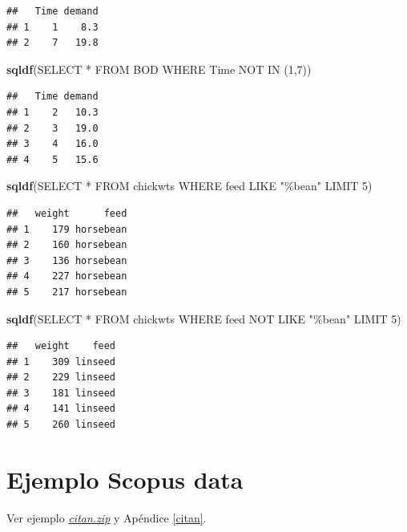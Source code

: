 \documentclass[
]{book}
\newenvironment{Shaded}{\begin{snugshade}}{\end{snugshade}}
\newcommand{\FunctionTok}[1]{\textcolor[rgb]{0.13,0.29,0.53}{\textbf{#1}}}
\newcommand{\NormalTok}[1]{#1}
\newcommand{\StringTok}[1]{\textcolor[rgb]{0.31,0.60,0.02}{#1}}
\begin{document}
\begin{verbatim}
##   Time demand
## 1    1    8.3
## 2    7   19.8
\end{verbatim}

\begin{Shaded}
\begin{Highlighting}[]
\FunctionTok{sqldf}\NormalTok{(}\StringTok{\textquotesingle{}SELECT * FROM BOD WHERE Time NOT IN (1,7)\textquotesingle{}}\NormalTok{)}
\end{Highlighting}
\end{Shaded}

\begin{verbatim}
##   Time demand
## 1    2   10.3
## 2    3   19.0
## 3    4   16.0
## 4    5   15.6
\end{verbatim}

\begin{Shaded}
\begin{Highlighting}[]
\FunctionTok{sqldf}\NormalTok{(}\StringTok{\textquotesingle{}SELECT * FROM chickwts WHERE feed LIKE "\%bean" LIMIT 5\textquotesingle{}}\NormalTok{)}
\end{Highlighting}
\end{Shaded}

\begin{verbatim}
##   weight      feed
## 1    179 horsebean
## 2    160 horsebean
## 3    136 horsebean
## 4    227 horsebean
## 5    217 horsebean
\end{verbatim}

\begin{Shaded}
\begin{Highlighting}[]
\FunctionTok{sqldf}\NormalTok{(}\StringTok{\textquotesingle{}SELECT * FROM chickwts WHERE feed NOT LIKE "\%bean" LIMIT 5\textquotesingle{}}\NormalTok{)}
\end{Highlighting}
\end{Shaded}

\begin{verbatim}
##   weight    feed
## 1    309 linseed
## 2    229 linseed
## 3    181 linseed
## 4    141 linseed
## 5    260 linseed
\end{verbatim}

\hypertarget{ejemplo-scopus-data}{%
\section{Ejemplo Scopus data}\label{ejemplo-scopus-data}}

Ver ejemplo \href{data/citan.zip}{\emph{citan.zip}} y Apéndice \ref{citan}.
\end{document}
